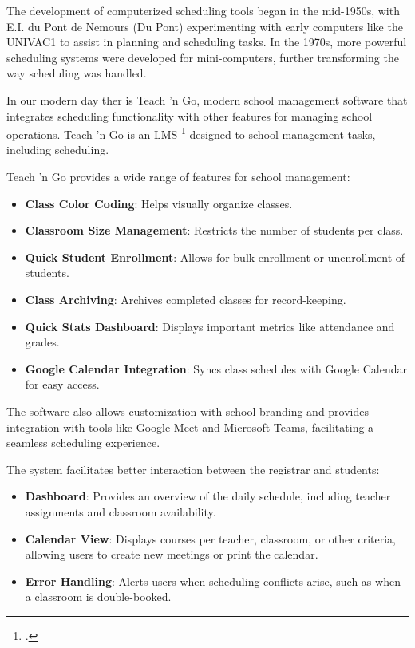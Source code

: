 
The development of computerized scheduling tools began in the mid-1950s, with E.I. du Pont de Nemours (Du Pont) experimenting with early computers like the UNIVAC1 to assist in planning and scheduling tasks. In the 1970s, more powerful scheduling systems were developed for mini-computers, further transforming the way scheduling was handled.

In our modern day ther is Teach 'n Go, modern school management software that integrates scheduling functionality with other features for managing school operations. Teach 'n Go is an LMS \footcite{LMS (Learning Management System)} designed to school management tasks, including scheduling.

Teach 'n Go provides a wide range of features for school management:
\begin{itemize}
    \item \textbf{Class Color Coding}: Helps visually organize classes.
    \item \textbf{Classroom Size Management}: Restricts the number of students per class.
    \item \textbf{Quick Student Enrollment}: Allows for bulk enrollment or unenrollment of students.
    \item \textbf{Class Archiving}: Archives completed classes for record-keeping.
    \item \textbf{Quick Stats Dashboard}: Displays important metrics like attendance and grades.
    \item \textbf{Google Calendar Integration}: Syncs class schedules with Google Calendar for easy access.
\end{itemize}

The software also allows customization with school branding and provides integration with tools like Google Meet and Microsoft Teams, facilitating a seamless scheduling experience.

The system facilitates better interaction between the registrar and students:
\begin{itemize}
    \item \textbf{Dashboard}: Provides an overview of the daily schedule, including teacher assignments and classroom availability.
    \item \textbf{Calendar View}: Displays courses per teacher, classroom, or other criteria, allowing users to create new meetings or print the calendar.
    \item \textbf{Error Handling}: Alerts users when scheduling conflicts arise, such as when a classroom is double-booked.
\end{itemize}

